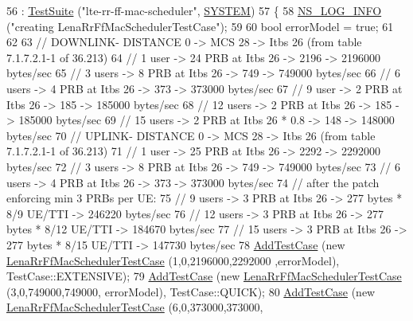 \begin{DoxyCode}
56   : \hyperlink{classns3_1_1TestSuite_a904b0c40583b744d30908aeb94636d1a}{TestSuite} (\textcolor{stringliteral}{"lte-rr-ff-mac-scheduler"}, \hyperlink{classns3_1_1TestSuite_a1ebfcab34ec8161e085e8e3a1855eae0a90c5529a26ab3a5ffcc6e57040dbd82e}{SYSTEM})
57 \{
58   \hyperlink{group__logging_gafbd73ee2cf9f26b319f49086d8e860fb}{NS\_LOG\_INFO} (\textcolor{stringliteral}{"creating LenaRrFfMacSchedulerTestCase"});
59 
60   \textcolor{keywordtype}{bool} errorModel = \textcolor{keyword}{true};
61 
62 
63   \textcolor{comment}{// DOWNLINK- DISTANCE 0 -> MCS 28 -> Itbs 26 (from table 7.1.7.2.1-1 of 36.213)}
64   \textcolor{comment}{// 1 user -> 24 PRB at Itbs 26 -> 2196 -> 2196000 bytes/sec}
65   \textcolor{comment}{// 3 users -> 8 PRB at Itbs 26 -> 749 -> 749000 bytes/sec}
66   \textcolor{comment}{// 6 users -> 4 PRB at Itbs 26 -> 373 -> 373000 bytes/sec}
67   \textcolor{comment}{// 9 user -> 2 PRB at Itbs 26 -> 185 -> 185000 bytes/sec}
68   \textcolor{comment}{// 12 users -> 2 PRB at Itbs 26 -> 185 -> 185000 bytes/sec}
69   \textcolor{comment}{// 15 users -> 2 PRB at Itbs 26 * 0.8 -> 148 -> 148000 bytes/sec}
70   \textcolor{comment}{// UPLINK- DISTANCE 0 -> MCS 28 -> Itbs 26 (from table 7.1.7.2.1-1 of 36.213)}
71   \textcolor{comment}{// 1 user -> 25 PRB at Itbs 26 -> 2292 -> 2292000 bytes/sec}
72   \textcolor{comment}{// 3 users -> 8 PRB at Itbs 26 -> 749 -> 749000 bytes/sec}
73   \textcolor{comment}{// 6 users -> 4 PRB at Itbs 26 -> 373 -> 373000 bytes/sec}
74   \textcolor{comment}{// after the patch enforcing min 3 PRBs per UE:}
75   \textcolor{comment}{// 9 users -> 3 PRB at Itbs 26 -> 277 bytes * 8/9 UE/TTI ->  246220 bytes/sec}
76   \textcolor{comment}{// 12 users -> 3 PRB at Itbs 26 -> 277 bytes * 8/12 UE/TTI -> 184670 bytes/sec}
77   \textcolor{comment}{// 15 users -> 3 PRB at Itbs 26 -> 277 bytes * 8/15 UE/TTI -> 147730 bytes/sec}
78   \hyperlink{classns3_1_1TestCase_a3718088e3eefd5d6454569d2e0ddd835}{AddTestCase} (\textcolor{keyword}{new} \hyperlink{classLenaRrFfMacSchedulerTestCase}{LenaRrFfMacSchedulerTestCase} (1,0,2196000,2292000
      ,errorModel), TestCase::EXTENSIVE);
79   \hyperlink{classns3_1_1TestCase_a3718088e3eefd5d6454569d2e0ddd835}{AddTestCase} (\textcolor{keyword}{new} \hyperlink{classLenaRrFfMacSchedulerTestCase}{LenaRrFfMacSchedulerTestCase} (3,0,749000,749000,
      errorModel), TestCase::QUICK);
80   \hyperlink{classns3_1_1TestCase_a3718088e3eefd5d6454569d2e0ddd835}{AddTestCase} (\textcolor{keyword}{new} \hyperlink{classLenaRrFfMacSchedulerTestCase}{LenaRrFfMacSchedulerTestCase} (6,0,373000,373000,

\end{DoxyCode}
